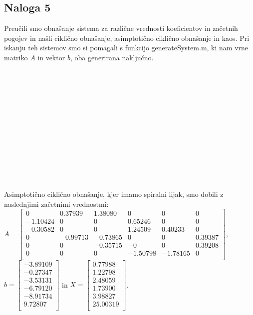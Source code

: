 \documentclass[a4paper, 12pt]{article}
\begin{document}
\subsection{Naloga 5} \label{nal5}
Preučili smo obnašanje sistema za različne vrednosti koeficientov in začetnih pogojev
in našli ciklično obnašanje, asimptotično ciklično obnašanje in kaos. Pri iskanju teh sistemov
smo si pomagali s funkcijo {\sf generateSystem.m}, ki nam vrne matriko $ A $ in vektor $ b $,
oba generirana naključno.
\\
\\
\\
\\
\\
\\
\\
\\
\\
\\
\\
\\
\\
\\
Asimptotično ciklično obnašanje, kjer imamo spiralni lijak, smo dobili z naslednjimi začetnimi vrednostmi:\\
$ A =
\begin{bmatrix}
	0 & 0.37939 & 1.38080 & 0 & 0 & 0 \\
	-1.10424 & 0 & 0 & 0.65246 & 0 & 0 \\
	-0.30582 & 0 & 0 & 1.24509 & 0.40233 & 0 \\
	0 & -0.99713 & -0.73865 & 0 & 0 & 0.39387 \\
	0 & 0 & -0.35715 & -0 & 0 & 0.39208 \\
	0 & 0 & 0 & -1.50798 & -1.78165 & 0 \\
\end{bmatrix} $, \\
$ b =
\begin{bmatrix}
	-3.89109 \\
	-0.27347 \\
	-3.53131 \\
	-6.79120 \\
	-8.91734 \\
	9.72807 \\
\end{bmatrix} $ in
$ X =
\begin{bmatrix}
	0.77988 \\
	1.22798 \\
	2.48059 \\
	1.73900 \\
	3.98827 \\
	25.00319 \\
\end{bmatrix} $. \\
\end{document}
